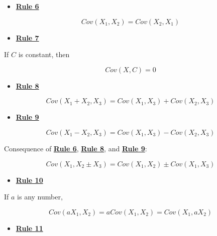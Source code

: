 \documentclass[
]{book}
\providecommand{\tightlist}{%
  \setlength{\itemsep}{0pt}\setlength{\parskip}{0pt}}
\begin{document}
\begin{itemize}
\tightlist
\item
  \href{./covariance.html\#Rule6}{\textbf{Rule 6}}
\end{itemize}

\[
Cov\left(X_{1}, X_{2}\right) = Cov\left(X_{2}, X_{1}\right)
\]

\begin{itemize}
\tightlist
\item
  \href{./covariance.html\#Rule7}{\textbf{Rule 7}}
\end{itemize}

If \(C\) is constant, then

\[
Cov\left(X, C\right) = 0
\]

\begin{itemize}
\tightlist
\item
  \href{./covariance.html\#Rule8}{\textbf{Rule 8}}
\end{itemize}

\[
Cov\left(X_{1} + X_{2}, X_{3}\right) = Cov\left(X_{1}, X_{3}\right) + Cov\left(X_{2}, X_{3}\right)  
\]

\begin{itemize}
\tightlist
\item
  \href{./covariance.html\#Rule9}{\textbf{Rule 9}}
\end{itemize}

\[
Cov\left(X_{1} - X_{2}, X_{3}\right) = Cov\left(X_{1}, X_{3}\right) - Cov\left(X_{2}, X_{3}\right)  
\]

Consequence of \href{./covariance.html\#Rule6}{\textbf{Rule 6}}, \href{./covariance.html\#Rule8}{\textbf{Rule 8}}, and \href{./covariance.html\#Rule9}{\textbf{Rule 9}}:

\[
Cov\left(X_{1}, X_{2} \pm X_{3}\right) = Cov\left(X_{1}, X_{2}\right) \pm Cov\left(X_{1}, X_{3}\right)  
\]

\begin{itemize}
\tightlist
\item
  \href{./covariance.html\#Rule10}{\textbf{Rule 10}}
\end{itemize}

If \(a\) is any number,

\[
Cov\left(a X_{1}, X_{2}\right) = a Cov\left(X_{1}, X_{2}\right) =  Cov\left(X_{1}, a X_{2}\right)  
\]

\begin{itemize}
\tightlist
\item
  \href{./covariance.html\#Rule11}{\textbf{Rule 11}}
\end{itemize}
\end{document}
